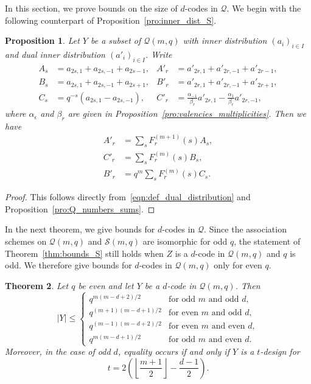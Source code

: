 \documentclass[10pt]{article}
\newtheorem{theorem}{Theorem}[section]
\newtheorem{prop}[theorem]{Proposition}
\theoremstyle{definition}
\newcommand{\Q}{\mathscr{Q}}
\renewcommand{\S}{\mathscr{S}}
\newcommand{\e}{\epsilon}
\newcommand{\abs}[1]{\lvert#1\rvert}
\begin{document}
In this section, we prove bounds on the size of $d$-codes in $\Q$. We begin with the following counterpart of Proposition~\ref{pro:inner_dist_S}.
\begin{prop}
\label{pro:inner_dist_Q}
Let $Y$ be a subset of $\Q(m,q)$ with inner distribution $(a_i)_{i\in I}$ and dual inner distribution $(a'_i)_{i\in I}$. Write 
\begin{align*}
A_s&=a_{2s,1}+a_{2s,-1}+a_{2s-1}, & A'_r&=a'_{2r,1}+a'_{2r,-1}+a'_{2r-1},\\
B_s&=a_{2s,1}+a_{2s,-1}+a_{2s+1}, & B'_r&=a'_{2r,1}+a'_{2r,-1}+a'_{2r+1},\\
C_s&=q^{-s}(a_{2s,1}-a_{2s,-1}),  & C'_r&=\frac{\alpha_{-1}}{\beta_r}a'_{2r,1}-\frac{\alpha_{1}}{\beta_r}a'_{2r,-1},
\end{align*}
where $\alpha_\e$ and $\beta_r$ are given in Proposition~\ref{pro:valencies_multiplicities}. Then we have
\begin{align*}
A'_r&=\sum_sF^{(m+1)}_r(s)A_s,\\
C'_r&=\sum_sF^{(m)}_r(s)B_s,\\
B'_r&=q^m\sum_sF^{(m)}_r(s)C_s.
\end{align*}
\end{prop}
\begin{proof}
This follows directly from~\eqref{eqn:def_dual_distribution} and Proposition~\ref{pro:Q_numbers_sums}.
\end{proof}
\par
In the next theorem, we give bounds for $d$-codes in $\Q$. Since the association schemes on $\Q(m,q)$ and $\S(m,q)$ are isomorphic for odd $q$, the statement of Theorem~\ref{thm:bounds_S} still holds when $Z$ is a $d$-code in $\Q(m,q)$ and $q$ is odd. We therefore give bounds for $d$-codes in $\Q(m,q)$ only for even $q$.
\begin{theorem}
\label{thm:bound_Q}
Let $q$ be even and let $Y$ be a $d$-code in $\Q(m,q)$. Then
\[
\abs{Y}\le\begin{cases}
q^{m(m-d+2)/2}     & \text{for odd $m$ and odd $d$},\\
q^{(m+1)(m-d+1)/2} & \text{for even $m$ and odd $d$},\\
q^{(m-1)(m-d+2)/2} & \text{for even $m$ and even $d$},\\
q^{m(m-d+1)/2}     & \text{for odd $m$ and even $d$}.
\end{cases}
\]
Moreover, in the case of odd $d$, equality occurs if and only if $Y$ is a $t$-design for
\[
t=2\left(\left\lfloor\frac{m+1}{2}\right\rfloor-\frac{d-1}{2}\right).
\]
\end{theorem}
\end{document}
